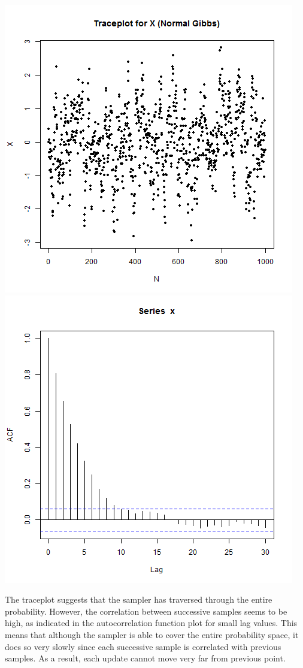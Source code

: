 \documentclass{article}
\begin{document}
\begin{enumerate}
\includegraphics[scale=0.4]{tracenorm.png}
\includegraphics[scale=0.4]{acfnorm.png}

The traceplot suggests that the sampler has traversed through the entire probability. However, the correlation between successive samples seems to be high, as indicated in the autocorrelation function plot for small lag values. This means that although the sampler is able to cover the entire probability space, it does so very slowly since each successive sample is correlated with previous samples. As a result, each update cannot move very far from previous point.


\end{enumerate}
\end{document}
